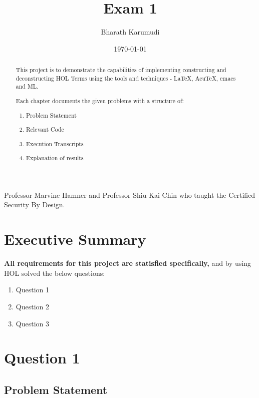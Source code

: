 \documentclass{report}
\title{Exam 1}
\author{Bharath Karumudi}
\date{\today}
\begin{document}
 \lstset{language=ML}
 \maketitle{}

 \begin{abstract}
   This project is to demonstrate the capabilities of implementing
   constructing and deconstructing HOL Terms using the tools and
   techniques - \LaTeX{}, AcuTeX, emacs and ML. 

   Each chapter documents the given problems with a structure of:
   \begin{enumerate}
   \item Problem Statement
   \item Relevant Code
   \item Execution Transcripts
   \item Explanation of results
   \end{enumerate}

 \end{abstract}


 \begin{acknowledgments}
  Professor Marvine Hamner and Professor Shiu-Kai Chin who taught the
  Certified Security By Design.
 \end{acknowledgments}

 \tableofcontents{}

 \chapter{Executive Summary}
 \label{cha:executive-summary}

\textbf{All requirements for this project are statisfied specifically,}
 and by using HOL solved the below questions:  

   \begin{enumerate}
   \item Question 1
   \item Question 2
   \item Question 3
   \end{enumerate}  




 \chapter{Question 1}
 \label{cha:ques1}
  
 \section{Problem Statement}
 \label{sec:problem-statement-1}
\end{document}
